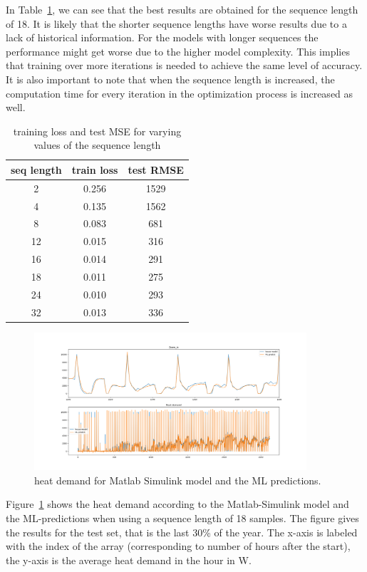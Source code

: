 In Table~\ref{tab:results_simulink}, we can see that the best results are obtained for the sequence length of 18. It is likely that the shorter sequence lengths have worse results due to a lack of historical information. For the models with longer sequences the performance might get worse due to the higher model complexity. This implies that training over more iterations is needed to achieve the same level of accuracy. It is also important to note that when the sequence length is increased, the computation time for every iteration in the optimization process is increased as well.
  
\begin{table}[H]
	\centering
		\begin{tabular}{c|c|c}
			\hline
			seq length & train loss & test RMSE  \\
			\hline
			\hline
			2 & 0.256 & 1529\\
			4 & 0.135 & 1562\\
			8 & 0.083	& 681\\
			12 & 0.015 & 316\\	
			16 & 0.014 & 291\\
			18 & 0.011 & 275\\
			24 & 0.010 & 293\\
			32 & 0.013 & 336\\
			\hline
		\end{tabular}
	\caption{training loss and test MSE for varying values of the sequence length}
	\label{tab:results_simulink}
\end{table}


\begin{figure}[H]
	\centering
		\includegraphics[width = 0.9\textwidth]{figures/seq_18_epoch_1000_Matlab1.png}
		\caption{heat demand for Matlab Simulink model and the ML predictions.}
	\label{fig:matlab_seq18}
\end{figure}

Figure~\ref{fig:matlab_seq18} shows the heat demand according to the Matlab-Simulink model and the ML-predictions when using a sequence length of 18 samples. The figure gives the results for the test set, that is the last 30\% of the year. The x-axis is labeled with the index of the array (corresponding to number of hours after the start), the y-axis is the average heat demand in the hour in W. 

